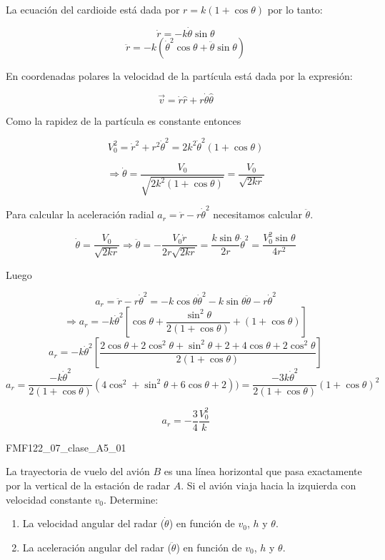 \documentclass[12pt,letterpaper]{report}
\begin{document}
\begin{solucion}
  La ecuación del cardioide está dada por $r=k(1+\cos \theta)$ por
lo tanto:

\[ \dot{r}= -k \dot\theta \sin\theta \]
\[ \ddot{r}= -k (\dot{\theta}^2 \cos\theta +\ddot{\theta}
\sin\theta)\]



 En coordenadas polares la velocidad de la partícula está dada por
la expresión:

\[ \vec{v}= \dot{r} \hat{r}+r\dot{\theta} \hat{\theta}\]

 Como la rapidez de la partícula es constante entonces

\[ V_0^2 = \dot{r}^2+r^2\dot{\theta}^2=2 k^2 \dot{\theta}^2
(1+\cos\theta)\]

\[\Longrightarrow
\boxed{\dot{\theta}=\frac{V_0}{\sqrt{2k^2(1+\cos\theta)}}=\frac{V_0}{\sqrt{2kr}}}\]

 Para calcular la aceleración radial $a_r=\ddot{r}-r\dot{\theta}^2$
necesitamos calcular $\ddot{\theta}$.

\[\dot{\theta}=\frac{V_0}{\sqrt{2kr}}\Longrightarrow \ddot{\theta}=-\frac{V_0 \dot{r}}{2r\sqrt{2kr}}=\frac{k\sin\theta}{2r}\dot{\theta}^2=\frac{V_0^2 \sin\theta}{4r^2}\]

 Luego

\[a_r=\ddot{r}-r\dot{\theta}^2= -k\cos\theta
\dot{\theta}^2-k\sin\theta\ddot{\theta}-r\dot{\theta}^2\]
\[\Longrightarrow a_r = -k\dot{\theta}^2\left[
\cos\theta+\frac{\sin^2\theta}{2(1+\cos\theta)}+(1+\cos\theta)\right]\]
\[a_r=-k\dot{\theta}^2\left[\frac{2\cos\theta+2\cos^2\theta+\sin^2\theta+2+4\cos\theta+2\cos^2\theta}{2(1+\cos\theta)}
\right]\]
\[a_r=\frac{-k\dot{\theta}^2}{2(1+\cos\theta)}(4\cos^2+\sin^2\theta+6\cos\theta+2))= \frac{-3k\dot{\theta}^2}{2(1+\cos\theta)}(1+\cos\theta)^2\]

\[ \boxed{a_r= -\frac{3}{4}\frac{V_0^2}{k}} \]

\end{solucion} 



\begin{ejemploclase}{FMF122_07_clase_A5_01}

 La trayectoria de vuelo del avión $B$ es una línea horizontal que pasa exactamente por la vertical de la estación de radar $A$. Si el avión viaja hacia la izquierda con velocidad constante $v_0$. Determine:
 
\begin{enumerate}
\item La velocidad angular del radar ($\dot{\theta}$) en función de $v_0$, $h$ y $\theta$.
\item  La aceleración angular del radar ($\ddot{\theta}$) en función de $v_0$, $h$ y $\theta$.
\end{enumerate}

\vspace{30mm}

\end{ejemploclase} 
\end{document}

